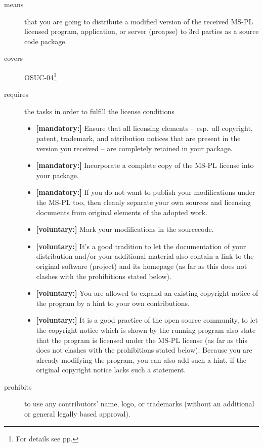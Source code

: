 \begin{description}

\item[means] that you are going to distribute a modified version of the received
MS-PL licensed program, application, or server (proapse) to 3rd parties as a
source code package.

\item[covers] OSUC-04\footnote{For details see pp. \pageref{OSUC-04-DEF}}

\item[requires] the tasks in order to fulfill the license conditions
\begin{itemize}
  \item \textbf{[mandatory:]} Ensure that all licensing elements -- esp.\ all
  copyright, patent, trademark, and attribution notices that are present in the
  version you received -- are completely retained in your package.
 
  \item \textbf{[mandatory:]} Incorporate a complete copy of the MS-PL license
  into your package.
  
  \item \textbf{[mandatory:]} If you do not want to publish your modifications
  under the MS-PL too, then cleanly separate your own sources and licensing
  documents from original elements of the adopted work.
  
  \item \textbf{[voluntary:]} Mark your modifications in the sourcecode.
  
  \item \textbf{[voluntary:]} It's a good tradition to let the documentation of
  your distribution and/or your additional material also contain a link to the
  original software (project) and its homepage (as far as this does not clashes
  with the prohibitions stated below).
  
  \item \textbf{[voluntary:]} You are allowed to expand an existing copyright
  notice of the program by a hint to your own contributions.
  
  \item \textbf{[voluntary:]} It is a good practice of the open source
  community, to let the copyright notice which is shown by the running program
  also state that the program is licensed under the MS-PL license (as far as
  this does not clashes with the prohibitions stated below). Because you are
  already modifying the program, you can also add such a hint, if the 
  original copyright notice lacks such a statement.
    
\end{itemize}

\item[prohibits] to use any contributors' name, logo, or trademarks (without an
additional or general legally based approval).

\end{description}


